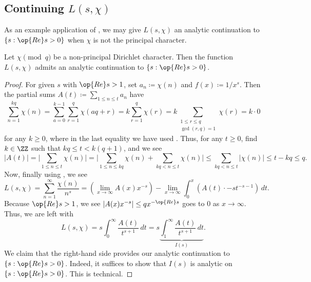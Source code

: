 \documentclass[../notes.tex]{subfiles}
\begin{document}
\subsection{Continuing \texorpdfstring{$L(s,\chi)$}{ L(s, chi)}}
As an example application of , we may give $L(s,\chi)$ an analytic continuation to $\{s:\op{Re}s>0\}$ when $\chi$ is not the principal character.
\begin{proposition} \label{prop:continue-l-chi}
	Let $\chi\pmod q$ be a non-principal Dirichlet character. Then the function $L(s,\chi)$ admits an analytic continuation to $\{s:\op{Re}s>0\}$.
\end{proposition}
\begin{proof}
	For given $s$ with $\op{Re}s>1$, set $a_n\coloneqq\chi(n)$ and $f(x)\coloneqq1/x^s$. Then the partial sums $A(t)\coloneqq\sum_{1\le n\le t}a_n$ have
	\[\sum_{n=1}^{kq}\chi(n)=\sum_{a=0}^{k-1}\sum_{r=1}^q\chi(aq+r)=k\sum_{r=1}^q\chi(r)=k\sum_{\substack{1\le r\le q\\\gcd(r,q)=1}}\chi(r)=k\cdot0\]
	for any $k\ge0$, where in the last equality we have used . Thus, for any $t\ge0$, find $k\in\ZZ$ such that $kq\le t<k(q+1)$, and we see
	\[|A(t)|=\Bigg|\sum_{1\le n\le t}\chi(n)\Bigg|=\Bigg|\sum_{1\le n\le kq}\chi(n)+\sum_{kq<n\le t}\chi(n)\Bigg|\le\sum_{kq<n\le t}|\chi(n)|\le t-kq\le q.\]
	Now, finally using , we see
	\[L(s,\chi)=\sum_{n=1}^\infty\frac{\chi(n)}{n^s}=\left(\lim_{x\to\infty}A(x)x^{-s}\right)-\lim_{x\to\infty}\int_0^x\left(A(t)\cdot -st^{-s-1}\right)\,dt.\]
	Because $\op{Re}s>1$, we see $\left|A(x)x^{-s}\right|\le qx^{-\op{Re}s}$ goes to $0$ as $x\to\infty$. Thus, we are left with
	\[L(s,\chi)=s\int_0^\infty\frac{A(t)}{t^{s+1}}\,dt=s\underbrace{\int_1^\infty\frac{A(t)}{t^{s+1}}\,dt}_{I(s)}.\]
	We claim that the right-hand side provides our analytic continuation to $\{s:\op{Re}s>0\}$. Indeed, it suffices to show that $I(s)$ is analytic on $\{s:\op{Re}s>0\}$. This is technical.
	

\end{proof}
\end{document}
